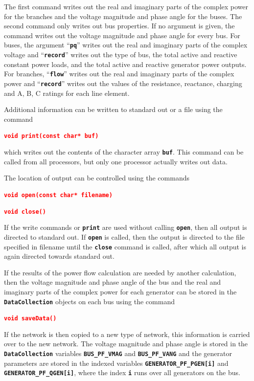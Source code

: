 \documentclass[12pt]{report} %
\begin{document}
The first command writes out the real and imaginary parts of the complex power for the branches and the voltage magnitude and phase angle for the buses. The second command only writes out bus properties. If no argument is given, the command writes out the voltage magnitude and phase angle for every bus. For buses, the argument ``\texttt{\textbf{pq}}'' writes out the real and imaginary parts of the complex voltage and ``\texttt{\textbf{record}}'' writes out the type of bus, the total active and reactive constant power loads, and the total active and reactive generator power outputs. For branches, ``\texttt{\textbf{flow}}'' writes out the real and imaginary parts of the complex power and ``\texttt{\textbf{record}}'' writes out the values of the resistance, reactance, charging and A, B, C ratings for each line element.

Additional information can be written to standard out or a file using the command

\textcolor{red}{\texttt{\textbf{void print(const char* buf)}}}

which writes out the contents of the character array \texttt{\textbf{buf}}. This command can be called from all processors, but only one processor actually writes out data.

The location of output can be controlled using the commands

\textcolor{red}{\texttt{\textbf{void open(const char* filename)}}}

\textcolor{red}{\texttt{\textbf{void close()}}}

If the write commands or \texttt{\textbf{print}} are used without calling \texttt{\textbf{open}}, then all output is directed to standard out. If \texttt{\textbf{open}} is called, then the output is directed to the file specified in filename until the \texttt{\textbf{close}} command is called, after which all output is again directed towards standard out.

If the results of the power flow calculation are needed by another calculation, then the voltage magnitude and phase angle of the bus and the real and imaginary parts of the complex power for each generator can be stored in the \texttt{\textbf{DataCollection}} objects on each bus using the command

\textcolor{red}{\texttt{\textbf{void saveData()}}}

If the network is then copied to a new type of network, this information is carried over to the new network. The voltage magnitude and phase angle is stored in the \texttt{\textbf{DataCollection}} variables \texttt{\textbf{BUS\_PF\_VMAG}} and \texttt{\textbf{BUS\_PF\_VANG}} and the generator parameters are stored in the indexed variables \texttt{\textbf{GENERATOR\_PF\_PGEN[i]}} and \texttt{\textbf{GENERATOR\_PF\_QGEN[i]}}, where the index \texttt{\textbf{i}} runs over all generators on the bus.
\end{document}
